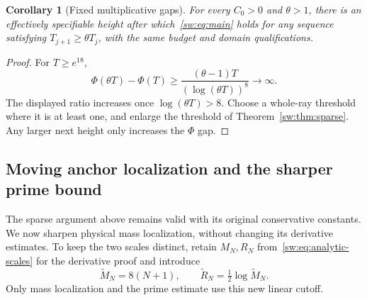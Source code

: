 \documentclass[11pt,a4paper]{article}
\numberwithin{equation}{section}
\newtheorem{corollary}[theorem]{Corollary}
\theoremstyle{definition}\newtheorem{definition}[theorem]{Definition}
\theoremstyle{remark}\newtheorem{remark}[theorem]{Remark}
\begin{document}
\begin{corollary}[Fixed multiplicative gaps]\label{sw:cor:geometric}
For every $C_0>0$ and $\theta>1$, there is an effectively specifiable height after which~\eqref{sw:eq:main} holds for any sequence satisfying $T_{j+1}\ge\theta T_j$, with the same budget and domain qualifications.
\end{corollary}
\begin{proof}
For $T\ge e^{18}$,
\[
 \Phi(\theta T)-\Phi(T)
 \ge\frac{(\theta-1)T}{(\log(\theta T))^8}\longrightarrow\infty.
\]
The displayed ratio increases once $\log(\theta T)>8$. Choose a whole-ray threshold where it is at least one, and enlarge the threshold of Theorem~\ref{sw:thm:sparse}. Any larger next height only increases the $\Phi$ gap.
\end{proof}

\subsection{Moving anchor localization and the sharper prime bound}\label{sw:sec:moving}
The sparse argument above remains valid with its original conservative constants. We now sharpen physical mass localization, without changing its derivative estimates. To keep the two scales distinct, retain $M_N,R_N$ from~\eqref{sw:eq:analytic-scales} for the derivative proof and introduce
\begin{equation}\label{sw:eq:linear-scale}
 \widetilde M_N=8(N+1),\qquad
 \widetilde R_N=\tfrac12\log\widetilde M_N.
\end{equation}
Only mass localization and the prime estimate use this new linear cutoff.
\end{document}
